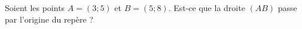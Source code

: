 
\begin{exercice}\label{exosmath-0069}

    Soient les points \( A=(3;5)\) et \( B=(5;8)\). Est-ce que la droite \( (AB)\) passe par l'origine du repère ?

\end{exercice}
